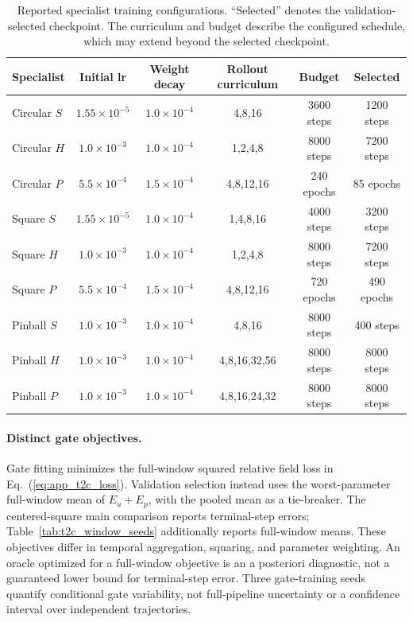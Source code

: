 \documentclass{article}
\def\plaineqref#1{\ref{#1}}
\begin{document}
\par


\begin{table}[H]
\centering
\caption{
Reported specialist training configurations. ``Selected'' denotes the validation-selected checkpoint. The curriculum and budget describe the configured schedule, which may extend beyond the selected checkpoint.
}
\label{tab:specialist_training}
\small
\setlength{\tabcolsep}{3.5pt}
\begin{tabular}{@{}lccccc@{}}
\toprule
Specialist & Initial lr & Weight decay & Rollout curriculum & Budget & Selected \\
\midrule
Circular $S$
& $1.55{\times}10^{-5}$ & $1.0{\times}10^{-4}$
& 4,8,16 & 3600 steps & 1200 steps \\
Circular $H$
& $1.0{\times}10^{-3}$ & $1.0{\times}10^{-4}$
& 1,2,4,8 & 8000 steps & 7200 steps \\
Circular $P$
& $5.5{\times}10^{-4}$ & $1.5{\times}10^{-4}$
& 4,8,12,16 & 240 epochs & 85 epochs \\
\addlinespace
Square $S$
& $1.55{\times}10^{-5}$ & $1.0{\times}10^{-4}$
& 1,4,8,16 & 4000 steps & 3200 steps \\
Square $H$
& $1.0{\times}10^{-3}$ & $1.0{\times}10^{-4}$
& 1,2,4,8 & 8000 steps & 7200 steps \\
Square $P$
& $5.5{\times}10^{-4}$ & $1.5{\times}10^{-4}$
& 4,8,12,16 & 720 epochs & 490 epochs \\
\addlinespace
Pinball $S$
& $1.0{\times}10^{-3}$ & $1.0{\times}10^{-4}$
& 4,8,16 & 8000 steps & 400 steps \\
Pinball $H$
& $1.0{\times}10^{-3}$ & $1.0{\times}10^{-4}$
& 4,8,16,32,56 & 8000 steps & 8000 steps \\
Pinball $P$
& $1.0{\times}10^{-3}$ & $1.0{\times}10^{-4}$
& 4,8,16,24,32 & 8000 steps & 8000 steps \\
\bottomrule
\end{tabular}
\end{table}


\par

\paragraph{Distinct gate objectives.}
Gate fitting minimizes the full-window squared relative field loss in Eq.~(\plaineqref{eq:app_t2c_loss}). Validation selection instead uses the worst-parameter full-window mean of $E_u+E_p$, with the pooled mean as a tie-breaker. The centered-square main comparison reports terminal-step errors; Table~\ref{tab:t2c_window_seeds} additionally reports full-window means. These objectives differ in temporal aggregation, squaring, and parameter weighting. An oracle optimized for a full-window objective is an a posteriori diagnostic, not a guaranteed lower bound for terminal-step error. Three gate-training seeds quantify conditional gate variability, not full-pipeline uncertainty or a confidence interval over independent trajectories.
\end{document}
